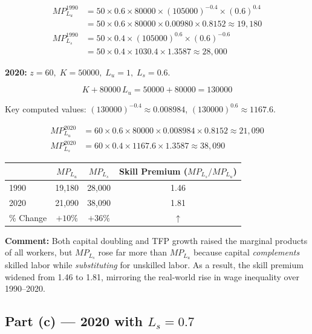 \documentclass[12pt]{article}
\begin{document}
\begin{align*}
    MP_{L_u}^{1990}
        &= 50 \times 0.6 \times 80000 \times (105000)^{-0.4} \times (0.6)^{0.4} \\
        &= 50 \times 0.6 \times 80000 \times 0.00980 \times 0.8152
         \approx 19{,}180 \\[4pt]
    MP_{L_s}^{1990}
        &= 50 \times 0.4 \times (105000)^{0.6} \times (0.6)^{-0.6} \\
        &= 50 \times 0.4 \times 1030.4 \times 1.3587
         \approx 28{,}000
\end{align*}

\textbf{2020:} $z=60,\; K=50000,\; L_u=1,\; L_s=0.6$.

\[
    K + 80000\,L_u = 50000 + 80000 = 130000
\]

Key computed values:
$(130000)^{-0.4} \approx 0.008984$,\;
$(130000)^{0.6} \approx 1167.6$.

\begin{align*}
    MP_{L_u}^{2020}
        &= 60 \times 0.6 \times 80000 \times 0.008984 \times 0.8152
         \approx 21{,}090 \\[4pt]
    MP_{L_s}^{2020}
        &= 60 \times 0.4 \times 1167.6 \times 1.3587
         \approx 38{,}090
\end{align*}

\begin{center}
\begin{tabular}{lccc}
\toprule
 & $MP_{L_u}$ & $MP_{L_s}$ & Skill Premium ($MP_{L_s}/MP_{L_u}$) \\
\midrule
1990 & 19,180 & 28,000 & 1.46 \\
2020 & 21,090 & 38,090 & 1.81 \\
\% Change & $+10\%$ & $+36\%$ & $\uparrow$ \\
\bottomrule
\end{tabular}
\end{center}

\textbf{Comment:} Both capital doubling and TFP growth raised the marginal
products of all workers, but $MP_{L_s}$ rose far more than $MP_{L_u}$ because
capital \emph{complements} skilled labor while \emph{substituting} for
unskilled labor. As a result, the skill premium widened from 1.46 to 1.81,
mirroring the real-world rise in wage inequality over 1990--2020.

\subsection*{Part (c) --- 2020 with $L_s = 0.7$}
\end{document}

